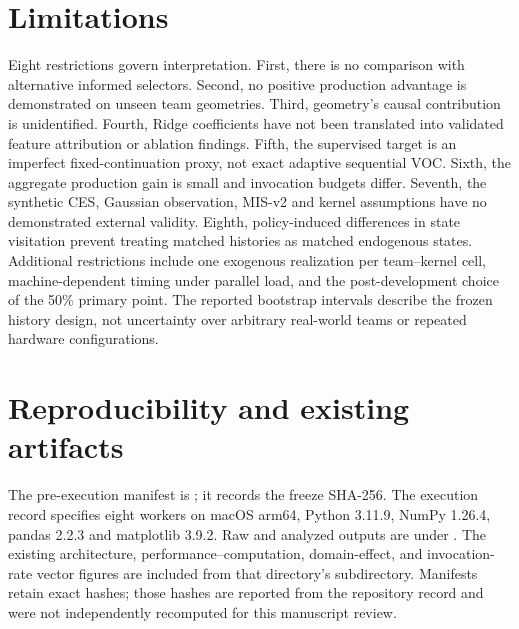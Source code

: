 \documentclass[11pt]{article}
\begin{document}
\section{Limitations}
Eight restrictions govern interpretation. First, there is no comparison with alternative informed selectors. Second, no positive production advantage is demonstrated on unseen team geometries. Third, geometry's causal contribution is unidentified. Fourth, Ridge coefficients have not been translated into validated feature attribution or ablation findings. Fifth, the supervised target is an imperfect fixed-continuation proxy, not exact adaptive sequential VOC. Sixth, the aggregate production gain is small and invocation budgets differ. Seventh, the synthetic CES, Gaussian observation, MIS-v2 and kernel assumptions have no demonstrated external validity. Eighth, policy-induced differences in state visitation prevent treating matched histories as matched endogenous states. Additional restrictions include one exogenous realization per team--kernel cell, machine-dependent timing under parallel load, and the post-development choice of the 50\% primary point. The reported bootstrap intervals describe the frozen history design, not uncertainty over arbitrary real-world teams or repeated hardware configurations.

\section{Reproducibility and existing artifacts}
The pre-execution manifest is ; it records the freeze SHA-256. The execution record specifies eight workers on macOS arm64, Python 3.11.9, NumPy 1.26.4, pandas 2.2.3 and matplotlib 3.9.2. Raw and analyzed outputs are under . The existing architecture, performance--computation, domain-effect, and invocation-rate vector figures are included from that directory's  subdirectory. Manifests retain exact hashes; those hashes are reported from the repository record and were not independently recomputed for this manuscript review.
\end{document}

